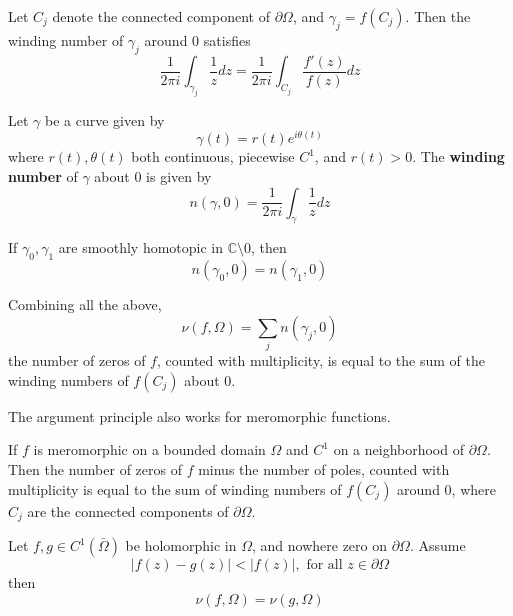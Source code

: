 \documentclass[openany]{book}
\newcommand{\C}{\mathbb{C}}
\begin{document}
\begin{prop}
    Let $C_j$ denote the connected component of $\partial\Omega$, and $\gamma_j=f(C_j)$. Then the winding number of $\gamma_j$ around $0$ satisfies
    \begin{equation*}
        \frac{1}{2\pi i}\int_{\gamma_j}\frac{1}{z}dz=\frac{1}{2\pi i}\int_{C_j}\frac{f'(z)}{f(z)}dz
    \end{equation*}
\end{prop}

\begin{defn}
    Let $\gamma$ be a curve given by 
    \begin{equation*}
        \gamma(t)=r(t)e^{i\theta(t)}
    \end{equation*}
    where $r(t),\theta(t)$ both continuous, piecewise $C^1$, and $r(t)>0$. The \textbf{winding number} of $\gamma$ about $0$ is given by 
    \begin{equation*}
        n(\gamma,0)=\frac{1}{2\pi i}\int_\gamma\frac{1}{z}dz
    \end{equation*}
\end{defn}

\begin{prop}
    If $\gamma_0,\gamma_1$ are smoothly homotopic in $\C\setminus 0$, then 
    \begin{equation*}
        n(\gamma_0,0)=n(\gamma_1,0)
    \end{equation*}
\end{prop}
Combining all the above,
\begin{equation*}
    \nu(f,\Omega)=\sum_j n(\gamma_j, 0)
\end{equation*}
the number of zeros of $f$, counted with multiplicity, is equal to the sum of the winding numbers of $f(C_j)$ about $0$.


The argument principle also works for meromorphic functions.
\begin{prop}
    If $f$ is meromorphic on a bounded domain $\Omega$ and $C^1$ on a neighborhood of $\partial\Omega$. Then the number of zeros of $f$ minus the number of poles, counted with multiplicity is equal to the sum of winding numbers of $f(C_j)$ around 0, where $C_j$ are the connected components of $\partial\Omega$.
\end{prop}

\begin{thm}
    Let $f,g\in C^1(\bar{\Omega})$ be holomorphic in $\Omega$, and nowhere zero on $\partial\Omega$. Assume 
    \begin{equation*}
        |f(z)-g(z)|<|f(z)|, \text{ for all } z\in\partial\Omega
    \end{equation*}
    then 
    \begin{equation*}
        \nu(f,\Omega)=\nu(g,\Omega)
    \end{equation*}
\end{thm}
\end{document}
